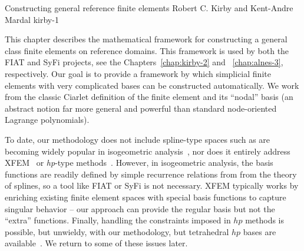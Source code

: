 \newcommand{\mathbfx}[1]{{\mbox{\boldmath $#1$}}}
\renewcommand{\P}{{\mathbb P}}
\renewcommand{\H}{{\mathbb H}}
\newcommand{\GG}{\mathbf{G}}
\newcommand{\kentc}[1]{\marginpar{\tiny KAM: #1}}
\newcommand{\rckc}[1]{\marginpar{\tiny RCK: #1}}

              {Constructing general reference finite elements}
              {Robert C. Kirby and Kent-Andre Mardal}
              {kirby-1}

%


\thispagestyle{empty}


This chapter describes the mathematical framework for constructing a
general class finite elements on 
reference domains. This framework is used by both the FIAT and SyFi
projects, see the Chapters~\ref{chap:kirby-2} and ~\ref{chap:alnes-3}, respectively.  
Our goal is to provide a framework by which simplicial finite elements
with very complicated bases can be constructed automatically.  We work from the classic Ciarlet definition of the finite
element and its ``nodal'' basis (an abstract notion far more general
and powerful than standard node-oriented Lagrange polynomials).  

To date, our methodology does not include spline-type spaces such as
are becoming widely popular in isogeometric analysis~\citep{HughesCottrellBazilevs2005}, nor does
it entirely address XFEM~\citep{ChessaSmolinskiBelytschko2002} or {\em hp}-type methods~\citep{Schwab1998}.  However, in isogeometric
analysis, the basis functions are readily defined by simple recurrence
relations from from the theory of splines, so a tool like FIAT or SyFi
is not necessary.  XFEM typically works by enriching existing
finite element spaces with special basis functions to capture singular
behavior -- our approach can provide the regular basis but not the
``extra'' functions.  Finally, handling the constraints imposed in
$hp$ methods is possible, but unwieldy, with our methodology, but
tetrahedral $hp$ bases are available~\citep{AinsworthCoyle2003}.  We
return to some of these issues later.

